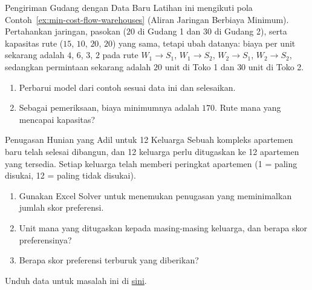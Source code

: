 \begin{ex}{Pengiriman Gudang dengan Data Baru}{}
\label{ex:network-flow-warmup}
 Latihan ini mengikuti pola Contoh~\ref{ex:min-cost-flow-warehouses} (Aliran Jaringan Berbiaya Minimum). Pertahankan jaringan, pasokan ($20$ di Gudang 1 dan $30$ di Gudang 2), serta kapasitas rute ($15$, $10$, $20$, $20$) yang sama, tetapi ubah datanya: biaya per unit sekarang adalah $4$, $6$, $3$, $2$ pada rute $W_1 \to S_1$, $W_1 \to S_2$, $W_2 \to S_1$, $W_2 \to S_2$, sedangkan permintaan sekarang adalah $20$ unit di Toko 1 dan $30$ unit di Toko 2.
\begin{enumerate}
\item Perbarui model dari contoh sesuai data ini dan selesaikan.
\item Sebagai pemeriksaan, biaya minimumnya adalah $170$. Rute mana yang mencapai kapasitas?
\end{enumerate}
\end{ex}


\begin{ex}{Penugasan Hunian yang Adil untuk 12 Keluarga}{}
\label{ex:fair-housing-assignment}
 Sebuah kompleks apartemen baru telah selesai dibangun, dan 12 keluarga perlu ditugaskan ke 12 apartemen yang tersedia. Setiap keluarga telah memberi peringkat apartemen (1 = paling disukai, 12 = paling tidak disukai).
\begin{enumerate}
\item Gunakan Excel Solver untuk menemukan penugasan yang meminimalkan jumlah skor preferensi.

\item Unit mana yang ditugaskan kepada masing-masing keluarga, dan berapa skor preferensinya?

\item Berapa skor preferensi terburuk yang diberikan?
\end{enumerate}
Unduh data untuk masalah ini di \href{https://github.com/open-optimization/open-optimization-or-book/blob/master/Intro-Math-Programming/baseText/optimization/optimization-examples/Family-Apartment_Preferences__12_.csv}{sini}.
\exrefs{\S\ref{sec:assignment-problem}}
\end{ex}

